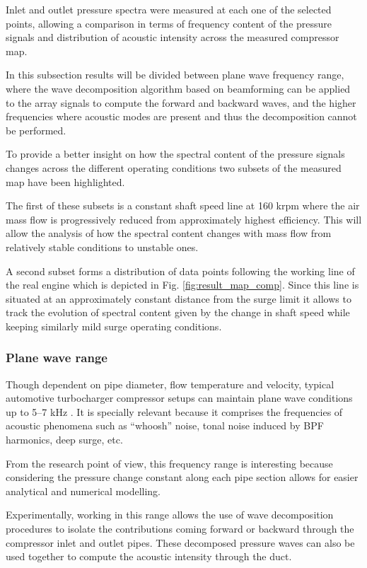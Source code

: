 Inlet and outlet pressure spectra were measured at each one of the selected points, allowing a comparison in terms of frequency content of the pressure signals and distribution of acoustic intensity across the measured compressor map.

In this subsection results will be divided between plane wave frequency range, where the wave decomposition algorithm based on beamforming can be applied to the array signals to compute the forward and backward waves, and the higher frequencies where acoustic modes are present and thus the decomposition cannot be performed.

To provide a better insight on how the spectral content of the pressure signals changes across the different operating conditions two subsets of the measured map have been highlighted.

The first of these subsets is a constant shaft speed line at 160 krpm where the air mass flow is progressively reduced from approximately highest efficiency. This will allow the analysis of how the spectral content changes with mass flow from relatively stable conditions to unstable ones.

A second subset forms a distribution of data points following the working line of the real engine which is depicted in Fig. \ref{fig:result_map_comp}. Since this line is situated at an  approximately constant distance from the surge limit it allows to track the evolution of spectral content given by the change in shaft speed while keeping similarly mild surge operating conditions. 

\subsubsection{Plane wave range}

Though dependent on pipe diameter, flow temperature and velocity, typical automotive turbocharger compressor setups can maintain plane wave conditions up to 5--7 kHz \cite{gaude2008experimental}. It is specially relevant because it comprises the frequencies of acoustic phenomena such as ``whoosh'' noise, tonal noise induced by BPF harmonics, deep surge, etc.

From the research point of view, this frequency range is interesting because considering the pressure change constant along each pipe section allows for easier analytical and numerical modelling. 

Experimentally, working in this range allows the use of wave decomposition procedures to isolate the contributions coming forward or backward through the compressor inlet and outlet pipes. These decomposed pressure waves can also be used together to compute the acoustic intensity through the duct.

